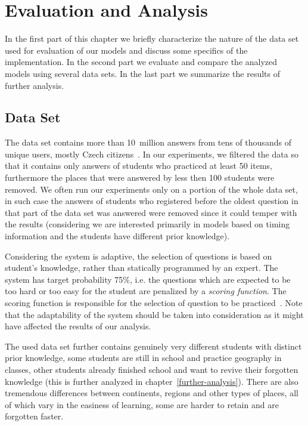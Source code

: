 \chapter{Evaluation and Analysis}

In the first part of this chapter we briefly characterize the nature of the data set used for evaluation of our models and discuss some specifics of the implementation. In the second part we evaluate and compare the analyzed models using several data sets. In the last part we summarize the results of further analysis.

\section{Data Set}

The data set contains more than 10~million answers from tens of thousands of unique users, mostly Czech citizens~\cite{Papousek2015}. In our experiments, we filtered the data so that it contains only answers of students who practiced at least 50 items, furthermore the places that were answered by less then 100 students were removed. We often run our experiments only on a portion of the whole data set, in such case the answers of students who registered before the oldest question in that part of the data set was answered were removed since it could temper with the results (considering we are interested primarily in models based on timing information and the students have different prior knowledge).

Considering the system is adaptive, the selection of questions is based on student's knowledge, rather than statically programmed by an expert. The system has target probability 75\%, i.e. the questions which are expected to be too hard or too easy for the student are penalized by a \textit{scoring function}. The scoring function is responsible for the selection of question to be practiced~\cite{Stanislav2015thesis}. Note that the adaptability of the system should be taken into consideration as it might have affected the results of our analysis.

The used data set further contains genuinely very different students with distinct prior knowledge, some students are still in school and practice geography in classes, other students already finished school and want to revive their forgotten knowledge (this is further analyzed in chapter~\ref{further-analysis}). There are also tremendous differences between continents, regions and other types of places, all of which vary in the easiness of learning, some are harder to retain and are forgotten faster.

